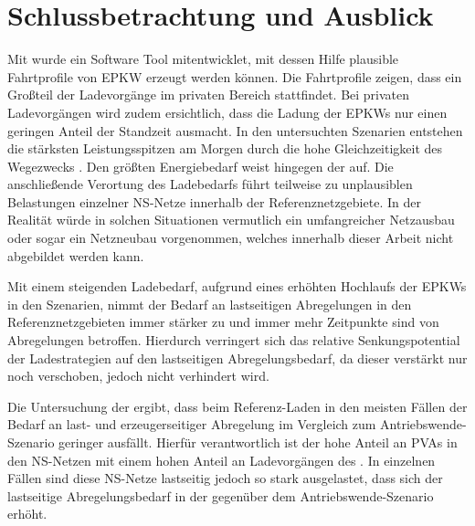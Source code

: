 \section{Schlussbetrachtung und Ausblick}\label{chap:schlussbetrachtung}

Mit  wurde ein Software Tool mitentwicklet, mit dessen Hilfe plausible Fahrtprofile von \gls{EPKW} erzeugt werden können.
Die Fahrtprofile zeigen, dass ein Großteil der Ladevorgänge im privaten Bereich stattfindet.
Bei privaten Ladevorgängen wird zudem ersichtlich, dass die Ladung der \glspl{EPKW} nur einen geringen Anteil der Standzeit ausmacht.
In den untersuchten Szenarien entstehen die stärksten Leistungsspitzen am Morgen durch die hohe Gleichzeitigkeit des Wegezwecks \Arbeitdot.
Den größten Energiebedarf weist hingegen der \UC \zH auf.
Die anschließende Verortung des Ladebedarfs führt teilweise zu unplausiblen Belastungen einzelner \gls{NS}-Netze innerhalb der Referenznetzgebiete.
In der Realität würde in solchen Situationen vermutlich ein umfangreicher Netzausbau oder sogar ein Netzneubau vorgenommen, welches innerhalb dieser Arbeit nicht abgebildet werden kann.\medskip

Mit einem steigenden Ladebedarf, aufgrund eines erhöhten Hochlaufs der \glspl{EPKW} in den Szenarien, nimmt der Bedarf an lastseitigen Abregelungen in den Referenznetzgebieten immer stärker zu und immer mehr Zeitpunkte sind von Abregelungen betroffen.
Hierdurch verringert sich das relative Senkungspotential der Ladestrategien auf den lastseitigen Abregelungsbedarf, da dieser verstärkt nur noch verschoben, jedoch nicht verhindert wird.

Die Untersuchung der \SzeFirmenparkplatz ergibt, dass beim Referenz-Laden in den meisten Fällen der Bedarf an last- und erzeugerseitiger Abregelung im Vergleich zum Antriebswende-Szenario geringer ausfällt.
Hierfür verantwortlich ist der hohe Anteil an \glspl{PVA} in den \gls{NS}-Netzen mit einem hohen Anteil an Ladevorgängen des \UC \zHdot.
In einzelnen Fällen sind diese \gls{NS}-Netze lastseitig jedoch so stark ausgelastet, dass sich der lastseitige Abregelungsbedarf in der \SzeFirmenparkplatz gegenüber dem Antriebswende-Szenario erhöht.\medskip

